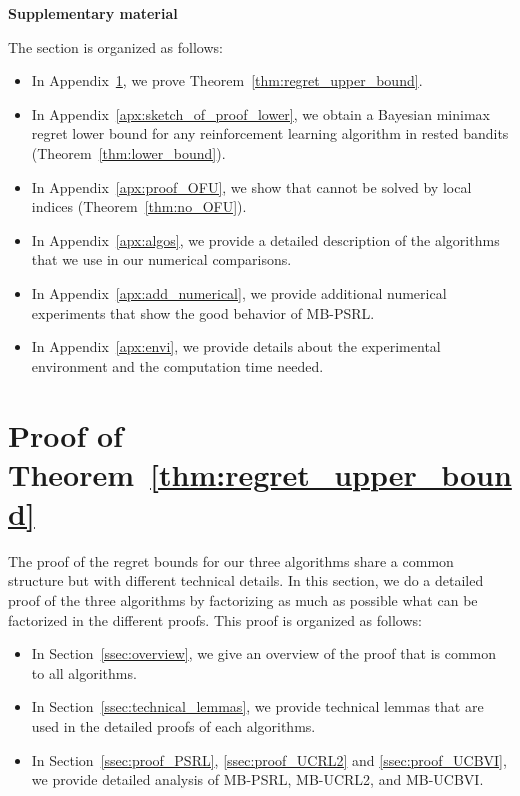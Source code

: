 \begin{subappendices}

\begin{center}
    \bfseries \Large Supplementary material
\end{center}

The section is organized as follows:
\begin{itemize}
    \item In Appendix~\ref{apx:proof_thm1}, we prove Theorem~\ref{thm:regret_upper_bound}. 
    \item In Appendix~\ref{apx:sketch_of_proof_lower}, we obtain a Bayesian minimax regret lower bound for any reinforcement learning algorithm in rested bandits (Theorem~\ref{thm:lower_bound}).
    \item In Appendix~\ref{apx:proof_OFU}, we show that  cannot be solved by local indices (Theorem~\ref{thm:no_OFU}).
    \item In Appendix~\ref{apx:algos}, we provide a detailed description of the algorithms that we use in our numerical comparisons. 
    \item In Appendix~\ref{apx:add_numerical}, we provide additional numerical experiments that show the good behavior of MB-PSRL. 
    \item In Appendix~\ref{apx:envi}, we provide details about the experimental environment and the computation time needed. 
\end{itemize}

\section{Proof of Theorem~\ref{thm:regret_upper_bound}}
\label{apx:proof_thm1}

The proof of the regret bounds for our three algorithms share a common structure but with different technical details.  In this section, we do a detailed proof of the three algorithms by factorizing as much as possible what can be factorized in the different proofs. This proof is organized as follows:
\begin{itemize}
    \item In Section~\ref{ssec:overview}, we give an overview of the proof that is common to all algorithms. 
    \item In Section~\ref{ssec:technical_lemmas}, we provide technical lemmas that are used in the detailed proofs of each algorithms. 
    \item In Section~\ref{ssec:proof_PSRL}, \ref{ssec:proof_UCRL2} and \ref{ssec:proof_UCBVI}, we provide detailed analysis of MB-PSRL, MB-UCRL2, and MB-UCBVI. 
\end{itemize}


\end{subappendices}
